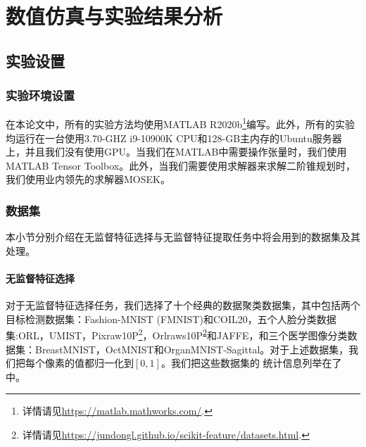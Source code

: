 \chapter{数值仿真与实验结果分析}\label{chap:exp}
\section{实验设置}

\subsection{实验环境设置}
在本论文中，所有的实验方法均使用MATLAB R2020b\footnote{详情请见\url{https://matlab.mathworks.com/}.}编写。此外，所有的实验均运行在一台使用3.70-GHZ i9-10900K CPU和128-GB主内存的Ubuntu服务器上，并且我们没有使用GPU。当我们在MATLAB中需要操作张量时，我们使用MATLAB Tensor Toolbox。此外，当我们需要使用求解器来求解二阶锥规划时，我们使用业内领先的求解器MOSEK。

\subsection{数据集}
本小节分别介绍在无监督特征选择与无监督特征提取任务中将会用到的数据集及其处理。
\subsubsection{无监督特征选择}
对于无监督特征选择任务，我们选择了十个经典的数据聚类数据集，其中包括两个目标检测数据集：Fashion-MNIST (FMNIST)和COIL20，五个人脸分类数据集:ORL，UMIST，Pixraw10P\footnote{\label{foot:scikit-feature}详情请见\url{https://jundongl.github.io/scikit-feature/datasets.html}.}，Orlraws10P\textsuperscript{\ref{foot:scikit-feature}}和JAFFE，和三个医学图像分类数据集：BreastMNIST，OctMNIST和OrganMNIST-Sagittal。对于上述数据集，我们把每个像素的值都归一化到$[0,1]$。我们把这些数据集的
统计信息列举在了中。

